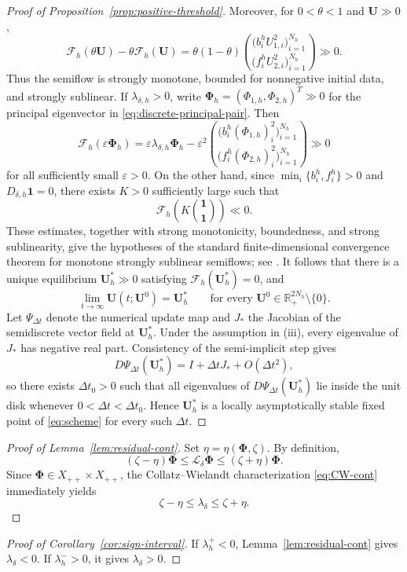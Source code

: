 \documentclass[11pt]{article}
\theoremstyle{definition}
\newcommand{\R}{\mathbb{R}}
\newcommand{\cL}{\mathcal{L}}
\newcommand{\one}{\mathbf{1}}
\newcommand{\U}{\bm U}
\newcommand{\PhiV}{\bm\Phi}
\begin{document}
\begin{proof}[Proof of Proposition~\ref{prop:positive-threshold}]
Moreover, for $0<\theta<1$ and $\U\gg0$,
\[
 \mathcal F_h(\theta\U)-\theta\mathcal F_h(\U)
 =
 \theta(1-\theta)
 \binom{
 \big(b_i^hU_{1,i}^2\big)_{i=1}^{N_h}}
 {
 \big(f_i^hU_{2,i}^2\big)_{i=1}^{N_h}}
 \gg0.
\]
Thus the semiflow is strongly monotone, bounded for
nonnegative initial data, and strongly sublinear.  If
$\lambda_{\delta,h}>0$, write
$\PhiV_h=(\Phi_{1,h},\Phi_{2,h})^T\gg0$ for the principal eigenvector in
\eqref{eq:discrete-principal-pair}.  Then
\[
 \mathcal F_h(\varepsilon\PhiV_h)
 =
 \varepsilon\lambda_{\delta,h}\PhiV_h
 -\varepsilon^2
 \binom{
  \big(b_i^h(\Phi_{1,h})_i^2\big)_{i=1}^{N_h}}
  {\big(f_i^h(\Phi_{2,h})_i^2\big)_{i=1}^{N_h}}
 \gg0
\]
for all sufficiently small $\varepsilon>0$.  On the other hand, since
$\min_i\{b_i^h,f_i^h\}>0$ and $D_{\delta,h}\one=0$, there exists $K>0$
sufficiently large such that
\[
\mathcal F_h\!\left(K\binom{\one}{\one}\right)\ll0.
\]
These estimates, together with strong monotonicity, boundedness, and strong
sublinearity, give the hypotheses of the standard finite-dimensional
convergence theorem for monotone strongly sublinear semiflows; see
\cite{Smith1995}.
It follows that there is a unique equilibrium $\U_h^*\gg0$ satisfying
$\mathcal F_h(\U_h^*)=0$, and
\[
 \lim_{t\to\infty}\U(t;\U^0)=\U_h^*
 \qquad
 \text{for every }
 \U^0\in\R_+^{2N_h}\setminus\{0\}.
\]
Let $\Psi_{\Delta t}$ denote the numerical update map and $J_*$ the Jacobian of the semidiscrete vector field at $\U_h^*$.  Under the assumption in (iii), every eigenvalue of $J_*$ has negative real part.  Consistency of the semi-implicit step gives
\[
 D\Psi_{\Delta t}(\U_h^*)
 =
 I+\Delta tJ_*+O(\Delta t^2),
\]
so there exists $\Delta t_0>0$ such that all eigenvalues of $D\Psi_{\Delta t}(\U_h^*)$ lie inside the unit disk whenever $0<\Delta t<\Delta t_0$.  Hence $\U_h^*$ is a locally asymptotically stable fixed point of \eqref{eq:scheme} for every such $\Delta t$.
\end{proof}

\begin{proof}[Proof of Lemma~\ref{lem:residual-cont}]
Set $\eta=\eta(\PhiV,\zeta)$.  By definition,
\[
 (\zeta-\eta)\PhiV
 \le
 \cL_\delta\PhiV
 \le
 (\zeta+\eta)\PhiV.
\]
Since $\PhiV\in X_{++}\times X_{++}$, the Collatz--Wielandt characterization \eqref{eq:CW-cont} immediately yields
\[
 \zeta-\eta
 \le\lambda_\delta
 \le\zeta+\eta.
\]
\end{proof}

\begin{proof}[Proof of Corollary~\ref{cor:sign-interval}]
If $\lambda_h^+<0$, Lemma~\ref{lem:residual-cont} gives $\lambda_\delta<0$.  If $\lambda_h^->0$, it gives $\lambda_\delta>0$.
\end{proof}
\end{document}
